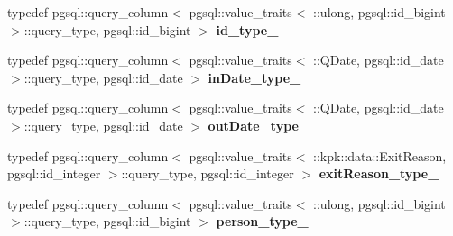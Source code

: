 \begin{DoxyCompactItemize}
\item 
typedef pgsql\+::query\+\_\+column$<$ pgsql\+::value\+\_\+traits$<$ \+::ulong, pgsql\+::id\+\_\+bigint $>$\+::query\+\_\+type, pgsql\+::id\+\_\+bigint $>$ {\bfseries id\+\_\+type\+\_\+}\hypertarget{structodb_1_1pointer__query__columns_3_01_1_1kpk_1_1data_1_1_member_00_01id__pgsql_00_01_a_01_4_a0b9fd2c0110c63076a2c4a98529c34c0}{}\label{structodb_1_1pointer__query__columns_3_01_1_1kpk_1_1data_1_1_member_00_01id__pgsql_00_01_a_01_4_a0b9fd2c0110c63076a2c4a98529c34c0}

\item 
typedef pgsql\+::query\+\_\+column$<$ pgsql\+::value\+\_\+traits$<$ \+::Q\+Date, pgsql\+::id\+\_\+date $>$\+::query\+\_\+type, pgsql\+::id\+\_\+date $>$ {\bfseries in\+Date\+\_\+type\+\_\+}\hypertarget{structodb_1_1pointer__query__columns_3_01_1_1kpk_1_1data_1_1_member_00_01id__pgsql_00_01_a_01_4_a6d5792ed86d4001711e1b029f172baea}{}\label{structodb_1_1pointer__query__columns_3_01_1_1kpk_1_1data_1_1_member_00_01id__pgsql_00_01_a_01_4_a6d5792ed86d4001711e1b029f172baea}

\item 
typedef pgsql\+::query\+\_\+column$<$ pgsql\+::value\+\_\+traits$<$ \+::Q\+Date, pgsql\+::id\+\_\+date $>$\+::query\+\_\+type, pgsql\+::id\+\_\+date $>$ {\bfseries out\+Date\+\_\+type\+\_\+}\hypertarget{structodb_1_1pointer__query__columns_3_01_1_1kpk_1_1data_1_1_member_00_01id__pgsql_00_01_a_01_4_af5f918bb8cefcd96427527e5bc463697}{}\label{structodb_1_1pointer__query__columns_3_01_1_1kpk_1_1data_1_1_member_00_01id__pgsql_00_01_a_01_4_af5f918bb8cefcd96427527e5bc463697}

\item 
typedef pgsql\+::query\+\_\+column$<$ pgsql\+::value\+\_\+traits$<$ \+::kpk\+::data\+::\+Exit\+Reason, pgsql\+::id\+\_\+integer $>$\+::query\+\_\+type, pgsql\+::id\+\_\+integer $>$ {\bfseries exit\+Reason\+\_\+type\+\_\+}\hypertarget{structodb_1_1pointer__query__columns_3_01_1_1kpk_1_1data_1_1_member_00_01id__pgsql_00_01_a_01_4_a5f1721d298e98c9f3f80f5204c435e15}{}\label{structodb_1_1pointer__query__columns_3_01_1_1kpk_1_1data_1_1_member_00_01id__pgsql_00_01_a_01_4_a5f1721d298e98c9f3f80f5204c435e15}

\item 
typedef pgsql\+::query\+\_\+column$<$ pgsql\+::value\+\_\+traits$<$ \+::ulong, pgsql\+::id\+\_\+bigint $>$\+::query\+\_\+type, pgsql\+::id\+\_\+bigint $>$ {\bfseries person\+\_\+type\+\_\+}\hypertarget{structodb_1_1pointer__query__columns_3_01_1_1kpk_1_1data_1_1_member_00_01id__pgsql_00_01_a_01_4_a7bcf07e0ab6a91af2d68c8215ef3a0e3}{}\label{structodb_1_1pointer__query__columns_3_01_1_1kpk_1_1data_1_1_member_00_01id__pgsql_00_01_a_01_4_a7bcf07e0ab6a91af2d68c8215ef3a0e3}

\end{DoxyCompactItemize}
